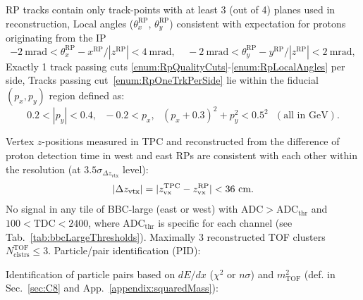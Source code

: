 \begin{enumerate}[label=\textbf{\hyperref[sec:C\arabic*]{C\arabic*}},ref=C\arabic*]
      \begin{enumerate}[label=\textbf{\theenumi.\arabic*},ref=\theenumi.\arabic*]
      \itemm RP tracks contain only track-points with at least 3 (out of 4) planes used in reconstruction,\label{enum:RpQualityCuts}
      \itemm Local angles ($\theta_{x}^{\text{RP}}$, $\theta_{y}^{\text{RP}}$) consistent with expectation for protons originating from the IP\label{enum:RpLocalAngles}%
      \[-2~\text{mrad}<\theta_{x}^{\text{RP}}-x^{\text{RP}}/|z^{\text{RP}}|<4~\text{mrad},~~~~~-2~\text{mrad}<\theta_{y}^{\text{RP}}-y^{\text{RP}}/|z^{\text{RP}}|<2~\text{mrad},\]
      \itemm Exactly 1 track passing cuts \ref{enum:RpQualityCuts}-\ref{enum:RpLocalAngles} per side,\label{enum:RpOneTrkPerSide}
      \itemm Tracks passing cut~\ref{enum:RpOneTrkPerSide} lie within the fiducial $(p_{x},p_{y})$ region defined as\label{enum:RpFiducial}:\\
      \[0.2<|p_{y}|<0.4,~~~-0.2<p_{x},~~~(p_{x}+0.3)^{2}+p_{y}^{2}<0.5^{2}~~~(\text{all in GeV}).\]
    \end{enumerate}
 \itemm Vertex $z$-positions measured in TPC and reconstructed from the difference of proton detection time in west and east RPs are consistent with each other within the resolution (at $3.5\sigma_{\Delta z_{\text{vtx}}}$ level):
 \[|\Delta z_{\text{vtx}}| = |z_{\text{vx}}^{\text{TPC}}-z_{\text{vx}}^{\text{RP}}|<36~\text{cm}.\vspace{-17pt}\]\label{enum:CutDeltaZVx}
 \itemm No signal in any tile of BBC-large (east or west) with $\text{ADC}>\text{ADC}_{\text{thr}}$ and $100<\text{TDC}<2400$, where $\text{ADC}_{\text{thr}}$ is specific for each channel (see Tab.~\ref{tab:bbcLargeThresholds}).\label{enum:CutBbcLarge}%
 \itemm Maximally 3 reconstructed TOF clusters $N^{\text{TOF}}_{\text{clstrs}}\leq 3$.\label{enum:CutTofClusters}%
 \itemm Particle/pair identification (PID):\label{enum:CutPid}
 \begin{enumerate}[label=\textbf{\theenumi.\arabic*},ref=\theenumi.\arabic*]
      \itemm Identification of particle pairs based on $dE/dx$ ($\chi^{2}$ or $n\sigma$) and $m^{2}_{\text{TOF}}$ (def. in Sec.~\ref{sec:C8} and App.~\ref{appendix:squaredMass}):\label{enum:CutPidNoPtLimit}\\[3pt]

\end{enumerate}
\end{enumerate}
